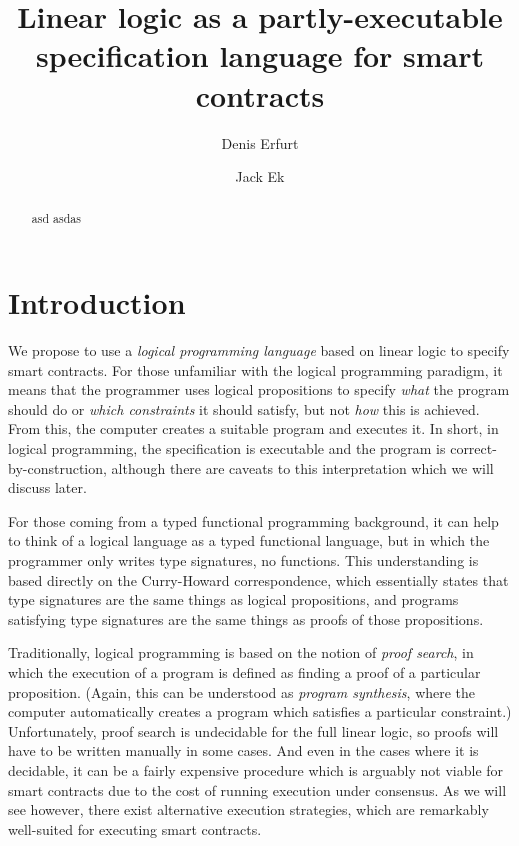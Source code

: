 \documentclass[sigconf]{acmart}
\begin{document}
\title{Linear logic as a partly-executable specification language for smart contracts}
\author{Denis Erfurt \and Jack Ek}

\begin{abstract}
  asd asdas
\end{abstract}

\maketitle

\section{Introduction}
We propose to use a \emph{logical programming language} based on linear logic to specify smart contracts. For those unfamiliar with the logical programming paradigm, it means that the programmer uses logical propositions to specify \emph{what} the program should do or \emph{which constraints} it should satisfy, but not \emph{how} this is achieved. From this, the computer creates a suitable program and executes it. In short, in logical programming, the specification is executable and the program is correct-by-construction, although there are caveats to this interpretation which we will discuss later.

For those coming from a typed functional programming background, it can help to think of a logical language as a typed functional language, but in which the programmer only writes type signatures, no functions. This understanding is based directly on the Curry-Howard correspondence, which essentially states that type signatures are the same things as logical propositions, and programs satisfying type signatures are the same things as proofs of those propositions. 

Traditionally, logical programming is based on the notion of \emph{proof search}, in which the execution of a program is defined as finding a proof of a particular proposition. (Again, this can be understood as \emph{program synthesis}, where the computer automatically creates a program which satisfies a particular constraint.) Unfortunately, proof search is undecidable for the full linear logic, so proofs will have to be written manually in some cases. And even in the cases where it is decidable, it can be a fairly expensive procedure which is arguably not viable for smart contracts due to the cost of running execution under consensus. As we will see however, there exist alternative execution strategies, which are remarkably well-suited for executing smart contracts.
\end{document}
